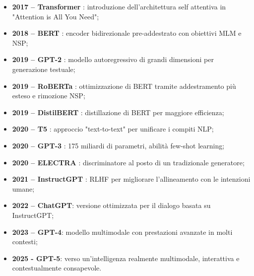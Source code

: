 \begin{itemize}
    \item \textbf{2017 – Transformer} \cite{vaswani2017attention}: introduzione dell’architettura self attentiva in "Attention is All You Need";
    \item \textbf{2018 – BERT} \cite{devlin2018bert}: encoder bidirezionale pre-addestrato con obiettivi MLM e NSP;
    \item \textbf{2019 – GPT-2} \cite{radford2019language}: modello autoregressivo di grandi dimensioni per generazione testuale;
    \item \textbf{2019 – RoBERTa} \cite{liu2019roberta}: ottimizzazione di BERT tramite addestramento più esteso e rimozione NSP;
    \item \textbf{2019 – DistilBERT} \cite{sanh2019distilbert}: distillazione di BERT per maggiore efficienza;
    \item \textbf{2020 – T5} \cite{raffel2020exploring}: approccio "text-to-text" per unificare i compiti NLP;
    \item \textbf{2020 – GPT-3} \cite{brown2020language}: 175 miliardi di parametri, abilità few-shot learning;
    \item \textbf{2020 – ELECTRA} \cite{clark2020electra}: discriminatore al posto di un tradizionale generatore;
    \item \textbf{2021 – InstructGPT} \cite{ouyang2022training}: RLHF per migliorare l’allineamento con le intenzioni umane;
    \item \textbf{2022 – ChatGPT}: versione ottimizzata per il dialogo basata su InstructGPT;
    \item \textbf{2023 – GPT-4}: modello multimodale con prestazioni avanzate in molti contesti;
    \item \textbf{2025 - GPT-5}: verso un'intelligenza realmente multimodale, interattiva e contestualmente consapevole.
\end{itemize}



